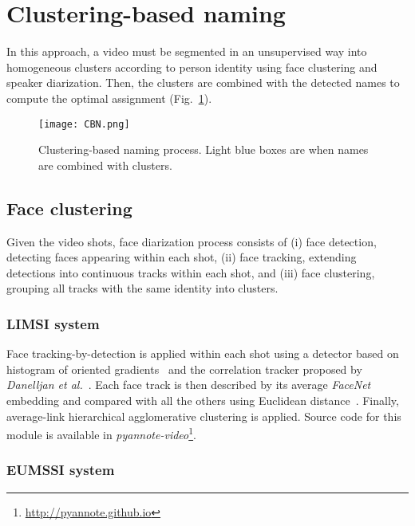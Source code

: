 \section{Clustering-based naming}
\label{sec:clustering}

In this approach, a video must be segmented in an unsupervised way into homogeneous clusters according to person identity using face clustering and speaker diarization. Then, the clusters are combined with the detected names to compute the optimal assignment (Fig.~\ref{fig:cbn}).

\begin{figure}[!htb]
 \centering
 \texttt{[image: CBN.png]}
\vspace*{-5mm}
 \caption{Clustering-based naming process. Light blue boxes are when names are combined with clusters.}
\vspace*{-5mm}
 \label{fig:cbn}
\end{figure}

\subsection{Face clustering}

Given the video shots, face diarization process consists of (i) face detection, detecting faces appearing within each shot, (ii) face tracking, extending detections into continuous tracks within each shot, and (iii) face clustering, grouping all tracks with the same identity into clusters.

\subsubsection{LIMSI system}

Face tracking-by-detection is applied within each shot using a detector based on histogram of oriented gradients~\cite{Dalal2005} and the correlation tracker proposed by \emph{Danelljan et al.}~\cite{Danelljan2014}. 
%
Each face track is then described by its average \emph{FaceNet} embedding and compared with all the others using Euclidean distance~\cite{Schroff2015}. 
%
Finally, average-link hierarchical agglomerative clustering is applied. Source code for this module is available in \emph{pyannote-video}\footnote{\url{http://pyannote.github.io}}.

\subsubsection{EUMSSI system}

